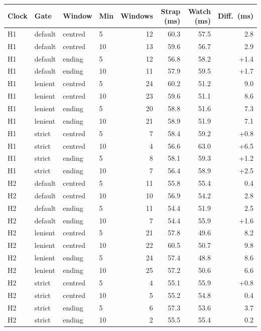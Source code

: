 \begin{tabular}{llllrrrr}
\toprule
Clock & Gate & Window & Min & Windows & Strap (ms) & Watch (ms) & Diff.\ (ms) \\
\midrule
H1 & default & centred & 5 & 12 & 60.3 & 57.5 & \textminus{}2.8 \\
H1 & default & centred & 10 & 13 & 59.6 & 56.7 & \textminus{}2.9 \\
H1 & default & ending & 5 & 12 & 56.8 & 58.2 & +1.4 \\
H1 & default & ending & 10 & 11 & 57.9 & 59.5 & +1.7 \\
H1 & lenient & centred & 5 & 24 & 60.2 & 51.2 & \textminus{}9.0 \\
H1 & lenient & centred & 10 & 23 & 59.6 & 51.1 & \textminus{}8.6 \\
H1 & lenient & ending & 5 & 20 & 58.8 & 51.6 & \textminus{}7.3 \\
H1 & lenient & ending & 10 & 21 & 58.9 & 51.9 & \textminus{}7.1 \\
H1 & strict & centred & 5 & 7 & 58.4 & 59.2 & +0.8 \\
H1 & strict & centred & 10 & 4 & 56.6 & 63.0 & +6.5 \\
H1 & strict & ending & 5 & 8 & 58.1 & 59.3 & +1.2 \\
H1 & strict & ending & 10 & 7 & 56.4 & 58.9 & +2.5 \\
H2 & default & centred & 5 & 11 & 55.8 & 55.4 & \textminus{}0.4 \\
H2 & default & centred & 10 & 10 & 56.9 & 54.2 & \textminus{}2.8 \\
H2 & default & ending & 5 & 11 & 54.4 & 51.9 & \textminus{}2.5 \\
H2 & default & ending & 10 & 7 & 54.4 & 55.9 & +1.6 \\
H2 & lenient & centred & 5 & 21 & 57.8 & 49.6 & \textminus{}8.2 \\
H2 & lenient & centred & 10 & 22 & 60.5 & 50.7 & \textminus{}9.8 \\
H2 & lenient & ending & 5 & 24 & 57.4 & 48.8 & \textminus{}8.6 \\
H2 & lenient & ending & 10 & 25 & 57.2 & 50.6 & \textminus{}6.6 \\
H2 & strict & centred & 5 & 4 & 55.1 & 55.9 & +0.8 \\
H2 & strict & centred & 10 & 5 & 55.2 & 54.8 & \textminus{}0.4 \\
H2 & strict & ending & 5 & 6 & 57.3 & 53.6 & \textminus{}3.7 \\
H2 & strict & ending & 10 & 2 & 55.5 & 55.4 & \textminus{}0.2 \\

\end{tabular}

